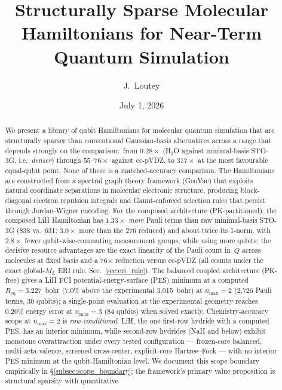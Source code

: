 \documentclass[twocolumn,pra,amsmath,amssymb,superscriptaddress]{revtex4-2}
\newcommand{\gvq}[2]{#2}
\begin{document}
\title{Structurally Sparse Molecular Hamiltonians for Near-Term Quantum Simulation}

\author{J.~Loutey}

\date{July 1, 2026}

\begin{abstract}
We present a library of qubit Hamiltonians for molecular quantum simulation
that are structurally sparser than conventional Gaussian-basis alternatives
across a range that depends strongly on the comparison:\ from
$0.28\times$ (H$_2$O against minimal-basis STO-3G, i.e.\ \emph{denser})
through $55$--$76\times$ against cc-pVDZ, to $317\times$ at the most
favourable equal-qubit point.  None of these is a matched-accuracy
comparison.
The Hamiltonians are constructed from
a spectral graph theory framework (GeoVac) that exploits natural coordinate
separations in molecular electronic structure, producing block-diagonal
electron repulsion integrals and Gaunt-enforced selection rules that persist
through Jordan-Wigner encoding. For the composed architecture (PK-partitioned),
the composed LiH Hamiltonian has $1.33\times$ \emph{more} Pauli terms than
raw minimal-basis STO-3G (\gvq{lih_composed_pauli}{838} vs.\ \gvq{lih_sto3g_raw}{631}; $3.0\times$ more than the 276
reduced) and about twice its 1-norm, with $2.8\times$ fewer
qubit-wise-commuting measurement groups, while using more qubits; the decisive resource advantages are the
exact linearity of the Pauli count in~$Q$ across molecules at fixed basis
and a 76$\times$ reduction versus cc-pVDZ (all counts under the exact
global-$M_L$ ERI rule, Sec.~\ref{sec:eri_rule}).
The balanced coupled architecture (PK-free) gives a LiH FCI
potential-energy-surface (PES) minimum
at a computed $R_{\mathrm{eq}} = 3.227$~bohr (7.0\% above the experimental
3.015~bohr) at $n_{\max}=2$ (\gvq{lih_balanced_pauli}{2{,}726} Pauli terms, 30 qubits); a single-point
evaluation at the experimental geometry reaches 0.20\% energy error at
$n_{\max}=3$ (84 qubits) when solved exactly.  Chemistry-accuracy scope at $n_{\max}=2$ is
\emph{row-conditional}: LiH, the one first-row hydride with a computed
PES, has an interior minimum, while
second-row hydrides (NaH and below) exhibit monotone overattraction under
every tested configuration --- frozen-core balanced, multi-zeta valence,
screened cross-center, explicit-core Hartree--Fock --- with no interior PES
minimum at the qubit-Hamiltonian level. We document this scope boundary
empirically in \S\ref{subsec:scope_boundary}; the framework's
primary value proposition is structural sparsity with quantitative

\end{abstract}
\end{document}
